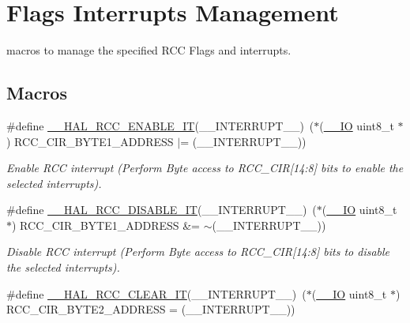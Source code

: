 \hypertarget{group___r_c_c___flags___interrupts___management}{}\section{Flags Interrupts Management}
\label{group___r_c_c___flags___interrupts___management}


macros to manage the specified R\+CC Flags and interrupts.  


\subsection*{Macros}
\begin{DoxyCompactItemize}
\item 
\#define \hyperlink{group___r_c_c___flags___interrupts___management_ga180fb20a37b31a6e4f7e59213a6c0405}{\+\_\+\+\_\+\+H\+A\+L\+\_\+\+R\+C\+C\+\_\+\+E\+N\+A\+B\+L\+E\+\_\+\+IT}(\+\_\+\+\_\+\+I\+N\+T\+E\+R\+R\+U\+P\+T\+\_\+\+\_\+)~($\ast$(\hyperlink{core__sc300_8h_aec43007d9998a0a0e01faede4133d6be}{\+\_\+\+\_\+\+IO} uint8\+\_\+t $\ast$) R\+C\+C\+\_\+\+C\+I\+R\+\_\+\+B\+Y\+T\+E1\+\_\+\+A\+D\+D\+R\+E\+SS $\vert$= (\+\_\+\+\_\+\+I\+N\+T\+E\+R\+R\+U\+P\+T\+\_\+\+\_\+))
\begin{DoxyCompactList}\small\item\em Enable R\+CC interrupt (Perform Byte access to R\+C\+C\+\_\+\+C\+IR\mbox{[}14\+:8\mbox{]} bits to enable the selected interrupts). \end{DoxyCompactList}\item 
\#define \hyperlink{group___r_c_c___flags___interrupts___management_gafc4df8cd4df0a529d11f18bf1f7e9f50}{\+\_\+\+\_\+\+H\+A\+L\+\_\+\+R\+C\+C\+\_\+\+D\+I\+S\+A\+B\+L\+E\+\_\+\+IT}(\+\_\+\+\_\+\+I\+N\+T\+E\+R\+R\+U\+P\+T\+\_\+\+\_\+)~($\ast$(\hyperlink{core__sc300_8h_aec43007d9998a0a0e01faede4133d6be}{\+\_\+\+\_\+\+IO} uint8\+\_\+t $\ast$) R\+C\+C\+\_\+\+C\+I\+R\+\_\+\+B\+Y\+T\+E1\+\_\+\+A\+D\+D\+R\+E\+SS \&= $\sim$(\+\_\+\+\_\+\+I\+N\+T\+E\+R\+R\+U\+P\+T\+\_\+\+\_\+))
\begin{DoxyCompactList}\small\item\em Disable R\+CC interrupt (Perform Byte access to R\+C\+C\+\_\+\+C\+IR\mbox{[}14\+:8\mbox{]} bits to disable the selected interrupts). \end{DoxyCompactList}\item 
\#define \hyperlink{group___r_c_c___flags___interrupts___management_ga9d8ab157f58045b8daf8136bee54f139}{\+\_\+\+\_\+\+H\+A\+L\+\_\+\+R\+C\+C\+\_\+\+C\+L\+E\+A\+R\+\_\+\+IT}(\+\_\+\+\_\+\+I\+N\+T\+E\+R\+R\+U\+P\+T\+\_\+\+\_\+)~($\ast$(\hyperlink{core__sc300_8h_aec43007d9998a0a0e01faede4133d6be}{\+\_\+\+\_\+\+IO} uint8\+\_\+t $\ast$) R\+C\+C\+\_\+\+C\+I\+R\+\_\+\+B\+Y\+T\+E2\+\_\+\+A\+D\+D\+R\+E\+SS = (\+\_\+\+\_\+\+I\+N\+T\+E\+R\+R\+U\+P\+T\+\_\+\+\_\+))

\end{DoxyCompactItemize}
